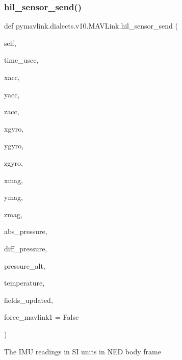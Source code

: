 \begin{DoxyVerb}
\begin{DoxyVerb}
\begin{DoxyVerb}
\begin{DoxyVerb}
\subsubsection{\texorpdfstring{hil\+\_\+sensor\+\_\+send()}{hil\_sensor\_send()}}
{\footnotesize\ttfamily def pymavlink.\+dialects.\+v10.\+M\+A\+V\+Link.\+hil\+\_\+sensor\+\_\+send (\begin{DoxyParamCaption}\item[{}]{self,  }\item[{}]{time\+\_\+usec,  }\item[{}]{xacc,  }\item[{}]{yacc,  }\item[{}]{zacc,  }\item[{}]{xgyro,  }\item[{}]{ygyro,  }\item[{}]{zgyro,  }\item[{}]{xmag,  }\item[{}]{ymag,  }\item[{}]{zmag,  }\item[{}]{abs\+\_\+pressure,  }\item[{}]{diff\+\_\+pressure,  }\item[{}]{pressure\+\_\+alt,  }\item[{}]{temperature,  }\item[{}]{fields\+\_\+updated,  }\item[{}]{force\+\_\+mavlink1 = {\ttfamily False} }\end{DoxyParamCaption})}

\begin{DoxyVerb}The IMU readings in SI units in NED body frame


\end{DoxyVerb}
\end{DoxyVerb}
\end{DoxyVerb}
\end{DoxyVerb}
\end{DoxyVerb}
